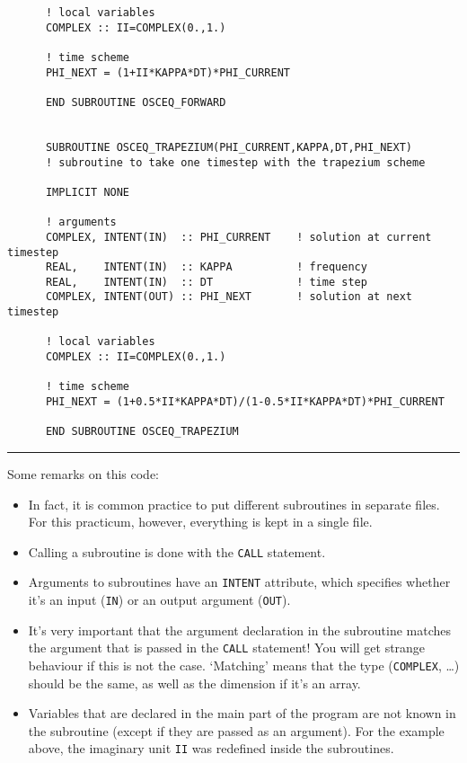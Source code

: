 \documentclass[a4paper]{article}
\begin{document}
{\begin{verbatim}
	  ! local variables
	  COMPLEX :: II=COMPLEX(0.,1.)
	  
	  ! time scheme
	  PHI_NEXT = (1+II*KAPPA*DT)*PHI_CURRENT
	  
	  END SUBROUTINE OSCEQ_FORWARD
	  

	  SUBROUTINE OSCEQ_TRAPEZIUM(PHI_CURRENT,KAPPA,DT,PHI_NEXT)
	  ! subroutine to take one timestep with the trapezium scheme
	  
	  IMPLICIT NONE
	  
	  ! arguments
	  COMPLEX, INTENT(IN)  :: PHI_CURRENT    ! solution at current timestep
	  REAL,    INTENT(IN)  :: KAPPA          ! frequency
	  REAL,    INTENT(IN)  :: DT             ! time step
	  COMPLEX, INTENT(OUT) :: PHI_NEXT       ! solution at next timestep
	  
	  ! local variables
	  COMPLEX :: II=COMPLEX(0.,1.)
	  
	  ! time scheme
	  PHI_NEXT = (1+0.5*II*KAPPA*DT)/(1-0.5*II*KAPPA*DT)*PHI_CURRENT
	  
	  END SUBROUTINE OSCEQ_TRAPEZIUM	  
\end{verbatim}\hrule\vspace{5pt}}
%
Some remarks on this code:
%
\begin{itemize}
	\item In fact, it is common practice to put different subroutines in separate files. For this practicum, however, everything is kept in a single file. 
	\item Calling a subroutine is done with the \verb+CALL+ statement. 
	\item Arguments to subroutines have an \verb+INTENT+ attribute, which specifies whether it's an input (\verb+IN+) or an output argument (\verb+OUT+).
	\item It's very important that the argument declaration in the subroutine matches the argument that is passed in the \verb+CALL+ statement! You will get strange behaviour if this is not the case. `Matching' means that the type (\verb+COMPLEX+, \ldots) should be the same, as well as the dimension if it's an array.
	\item Variables that are declared in the main part of the program are not known in the subroutine (except if they are passed as an argument). For the example above, the imaginary unit \verb+II+ was redefined inside the subroutines.
\end{itemize}
%
\end{document}
